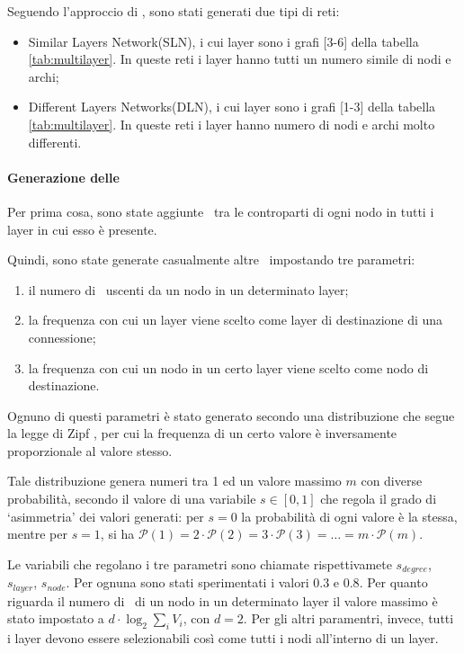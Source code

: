 Seguendo l'approccio di \cite{basaras:infspmul}, sono stati generati due tipi di reti:
\begin{itemize}
    \item Similar Layers Network(SLN), i cui layer sono i grafi [3-6] della  
            tabella \vref{tab:multilayer}. In queste reti i layer hanno tutti un numero simile 
            di nodi e archi;
    \item Different Layers Networks(DLN), i cui layer sono i grafi [1-3] della tabella 
        \vref{tab:multilayer}. In queste reti i layer hanno numero di nodi e archi molto differenti.
\end{itemize}

\paragraph{Generazione delle \interc}
Per prima cosa, sono state aggiunte \interc\ tra le controparti di ogni nodo in tutti 
i layer in cui esso è presente.

Quindi, sono state generate casualmente altre \interc\ impostando tre parametri:
\begin{enumerate}
    \item il numero di \interc\ uscenti da un nodo in un determinato layer;
    \item la frequenza con cui un layer viene scelto come layer di destinazione di 
        una connessione;
    \item la frequenza con cui un nodo in un certo layer viene scelto come nodo 
        di destinazione. 
\end{enumerate}
Ognuno di questi parametri è stato generato secondo una distribuzione che segue 
la legge di Zipf \cite{zipf:humanb}, per cui la frequenza di un certo valore è inversamente
proporzionale al valore stesso. 

Tale distribuzione genera numeri tra 1 ed un valore massimo $m$ con diverse probabilità,
secondo il valore di una variabile $s \in [0, 1]$
che regola il grado di `asimmetria' dei valori generati:
per $s=0$ la probabilità di ogni valore è la stessa, mentre per  
$s=1$, si ha $\mathcal{P}(1) = 2 \cdot \mathcal{P}(2) = 3 \cdot \mathcal{P}(3) =\dots = m \cdot \mathcal{P}(m)$. 

Le variabili che regolano i tre parametri sono chiamate rispettivamete
$s_{degree}$, $s_{layer}$, $s_{node}$.
Per ognuna sono stati sperimentati i valori $0.3$ e $0.8$. 
Per quanto riguarda il numero di \interc\ di un nodo in un determinato layer
il valore massimo è stato impostato a $d \cdot \log_2{\sum_{i}{V_i}}$, con 
$d = 2$. Per gli altri paramentri, invece, tutti i layer devono essere selezionabili
così come tutti i nodi all'interno di un layer.

